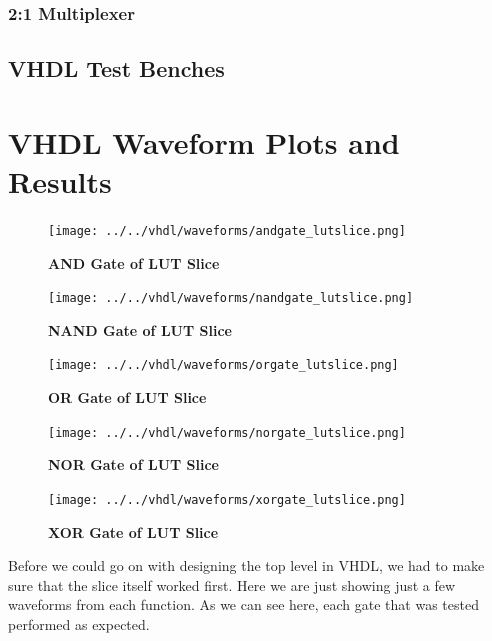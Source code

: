 \documentclass[a4paper]{article}
\begin{document}
\subsubsection{\textbf{2:1 Multiplexer}}

    

\subsection{\textbf{VHDL Test Benches}}

    
    

\section{\textbf{VHDL Waveform Plots and Results}}

    \begin{figure}[H]
        \centering
        \texttt{[image: ../../vhdl/waveforms/andgate\_lutslice.png]}
        \caption{\textbf{AND Gate of LUT Slice}}
        \label{fig:gg}
    \end{figure}
    \begin{figure}[H]
        \centering
        \texttt{[image: ../../vhdl/waveforms/nandgate\_lutslice.png]}
        \caption{\textbf{NAND Gate of LUT Slice}}
        \label{fig:gg}
    \end{figure}
    \begin{figure}[H]
        \centering
        \texttt{[image: ../../vhdl/waveforms/orgate\_lutslice.png]}
        \caption{\textbf{OR Gate of LUT Slice}}
        \label{fig:gg}
    \end{figure}
    \begin{figure}[H]
        \centering
        \texttt{[image: ../../vhdl/waveforms/norgate\_lutslice.png]}
        \caption{\textbf{NOR Gate of LUT Slice}}
        \label{fig:gg}
    \end{figure}
    \begin{figure}[H]
        \centering
        \texttt{[image: ../../vhdl/waveforms/xorgate\_lutslice.png]}
        \caption{\textbf{XOR Gate of LUT Slice}}
        \label{fig:gg}
    \end{figure}

    Before we could go on with designing the top level in VHDL, we had to make sure that the slice itself worked first. Here
    we are just showing just a few waveforms from each function. As we can see here, each gate that was tested performed
    as expected.
\end{document}
